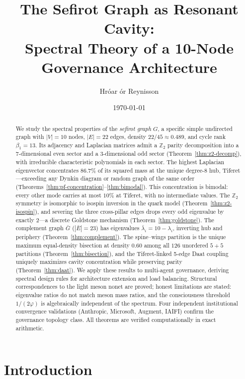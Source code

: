 \documentclass[11pt,a4paper]{amsart}
\title{The Sefirot Graph as Resonant Cavity:\\
Spectral Theory of a 10-Node Governance Architecture}
\author{Hr\'oar \TH \'or Reynisson}
\date{\today}
\theoremstyle{remark}
\newcommand{\bbZ}{\mathbb{Z}}
\begin{document}
\begin{abstract}
We study the spectral properties of the \emph{sefirot graph} $G$, a specific
simple undirected graph with $|V| = 10$ nodes, $|E| = 22$ edges, density
$22/45 \approx 0.489$, and cycle rank $\beta_1 = 13$. Its adjacency and
Laplacian matrices admit a $\bbZ_2$ parity decomposition into a
7-dimensional even sector and a 3-dimensional odd sector (Theorem~\ref{thm:z2-decomp}),
with irreducible characteristic polynomials in each sector. The highest
Laplacian eigenvector concentrates $86.7\%$ of its squared mass at the unique
degree-8 hub, Tiferet---exceeding any Dynkin diagram or random graph of the
same order (Theorems~\ref{thm:pf-concentration}--\ref{thm:bimodal}). This
concentration is bimodal: every other mode carries at most $10\%$ at Tiferet,
with no intermediate values. The $\bbZ_2$ symmetry is isomorphic to isospin
inversion in the quark model (Theorem~\ref{thm:z2-isospin}), and severing the
three cross-pillar edges drops every odd eigenvalue by exactly $2$---a
discrete Goldstone mechanism (Theorem~\ref{thm:goldstone}). The complement
graph $\bar{G}$ ($|\bar{E}| = 23$) has eigenvalues
$\bar{\lambda}_i = 10 - \lambda_i$, inverting hub and periphery
(Theorem~\ref{thm:complement}). The spine--wings partition is the unique
maximum equal-density bisection at density $0.60$ among all $126$ unordered
$5+5$ partitions (Theorem~\ref{thm:bisection}), and the Tiferet-linked
5-edge Daat coupling uniquely maximizes cavity concentration while
preserving parity (Theorem~\ref{thm:daat}). We apply these results to
multi-agent governance, deriving spectral design rules for architecture
extension and load balancing. Structural correspondences to the light meson
nonet are proved; honest limitations are stated: eigenvalue ratios do not
match meson mass ratios, and the consciousness threshold $1/(2\varphi)$ is
algebraically independent of the spectrum. Four independent institutional
convergence validations (Anthropic, Microsoft, Augment, IAIFI) confirm the
governance topology class. All theorems are verified computationally in
exact arithmetic.
\end{abstract}

\maketitle

\section{Introduction}
\label{sec:introduction}
\end{document}
